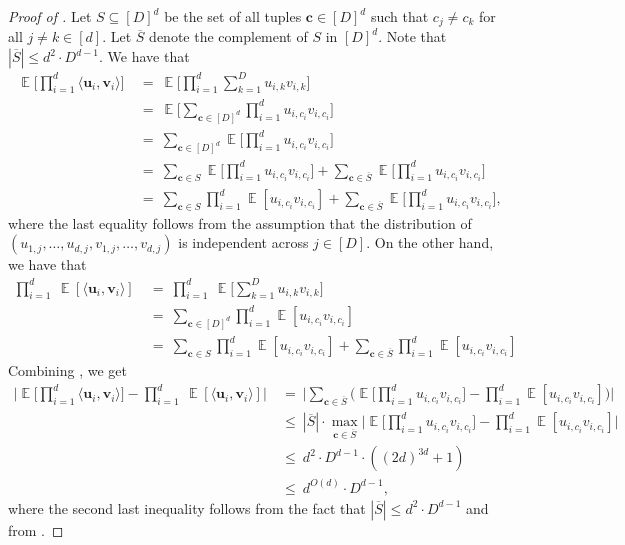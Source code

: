 \documentclass[11pt]{article}
\newcommand{\inparen}[1]{\left ( #1 \right )}
\DeclareMathOperator*{\Ex}{\mathbb{E}}
\newcommand{\bc}{{\bm c}}
\newcommand{\bu}{{\bm u}}
\newcommand{\bv}{{\bm v}}
\begin{document}
\begin{proof}[Proof of ]
	Let $S \subseteq [D]^d$ be the set of all tuples $\bc \in [D]^d$ such that $c_j \neq c_k$ for all $j \neq k \in [d]$. Let $\overline{S}$ denote the complement of $S$ in $[D]^d$. Note that $|\overline{S}| \le d^2 \cdot D^{d-1}$. We have that
	\begin{align}
	\Ex\bigg[ \prod_{i=1}^d \langle \bu_i, \bv_i \rangle \bigg] &~=~ \Ex\bigg[ \prod_{i=1}^d \sum_{k=1}^D u_{i,k} v_{i,k}  \bigg] \nonumber \\ 
	&~=~ \Ex \bigg[ \sum_{\bc \in [D]^d} \prod_{i=1}^d u_{i, c_i} v_{i, c_i} \bigg] \nonumber \\ 
	&~=~ \sum_{\bc \in [D]^d} \Ex \bigg[ \prod_{i=1}^d u_{i, c_i} v_{i, c_i} \bigg] \nonumber \\ 
	&~=~ \sum_{\bc \in S} \Ex \bigg[ \prod_{i=1}^d u_{i, c_i} v_{i, c_i} \bigg] + \sum_{\bc \in \overline{S}} \Ex \bigg[ \prod_{i=1}^d u_{i, c_i} v_{i, c_i} \bigg] \nonumber\\ 
	&~=~ \sum_{\bc \in S} \prod_{i=1}^d \Ex[ u_{i, c_i} v_{i, c_i}] + \sum_{\bc \in \overline{S}} \Ex \bigg[ \prod_{i=1}^d u_{i, c_i} v_{i, c_i} \bigg], \label{eq:exp_of_prod}
	\end{align}
	where the last equality follows from the assumption that the distribution of $(u_{1,j}, \ldots, u_{d,j}, v_{1,j}, \ldots, v_{d,j})$ is independent across $j \in [D]$. On the other hand, we have that
	\begin{align}
	\prod_{i=1}^d \ \Ex [ \langle \bu_i, \bv_i \rangle ] &~=~ \prod_{i=1}^d \ \Ex \bigg[ \sum_{k=1}^D u_{i,k} v_{i,k} \bigg] \nonumber\\
	&~=~ \sum_{\bc \in [D]^d} \prod_{i=1}^d \Ex[ u_{i, c_i} v_{i, c_i}] \nonumber\\
	&~=~ \sum_{\bc \in S} \prod_{i=1}^d \Ex[ u_{i, c_i} v_{i, c_i}] + \sum_{\bc \in \overline{S}} \prod_{i=1}^d \Ex[ u_{i, c_i} v_{i, c_i}] \label{eq:prod_of_exp}
	\end{align}
	Combining , we get
	\begin{align*}
	\bigg| \Ex\bigg[ \prod_{i=1}^d \langle \bu_i, \bv_i \rangle \bigg] - \prod_{i=1}^d \ \Ex [ \langle \bu_i, \bv_i \rangle ] \bigg|
	&~=~  \bigg|  \sum_{\bc \in \overline{S}} \bigg( \Ex \bigg[ \prod_{i=1}^d u_{i, c_i} v_{i, c_i}\bigg] - \prod_{i=1}^d \Ex[ u_{i, c_i} v_{i, c_i}]  \bigg) \bigg|\\ 
	&~\le~ |\overline{S}| \cdot \max_{\bc \in \overline{S}} \bigg|  \Ex \bigg[ \prod_{i=1}^d u_{i, c_i} v_{i, c_i}\bigg] - \prod_{i=1}^d \Ex[ u_{i, c_i} v_{i, c_i}]  \bigg|\\ 
	&~\le~ d^2 \cdot D^{d-1} \cdot \inparen{(2d)^{3d} + 1}\\
	&~\le~ d^{O(d)} \cdot D^{d-1},
	\end{align*}
	where the second last inequality follows from the fact that $|\overline{S}| \le d^2 \cdot D^{d-1}$ and from .
\end{proof}
\end{document}
